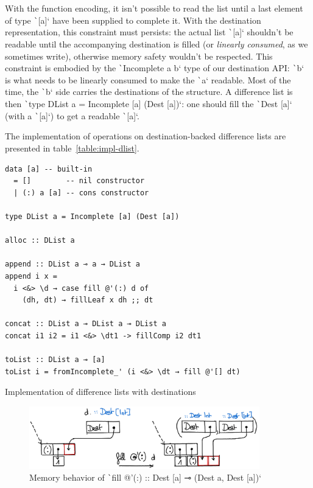 \documentclass[english]{jflart}
\begin{document}
With the function encoding, it isn't possible to read the list until a last element of type \texttt`[a]` have been supplied to complete it. With the destination representation, this constraint must persists: the actual list \texttt`[a]` shouldn't be readable until the accompanying destination is filled (or \emph{linearly consumed}, as we sometimes write), otherwise memory safety wouldn't be respected. This constraint is embodied by the \texttt`Incomplete a b` type of our destination API: \texttt`b` is what needs to be linearly consumed to make the \texttt`a` readable. Most of the time, the \texttt`b` side carries the destinations of the structure. A difference list is then \texttt`type DList a = Incomplete [a] (Dest [a])`: one should fill the \texttt`Dest [a]` (with a \texttt`[a]`) to get a readable \texttt`[a]`.

The implementation of operations on destination-backed difference lists are presented in table~\ref{table:impl-dlist}.
\begin{table}[t]
\small
\begin{verbatim}
data [a] -- built-in
  = []        -- nil constructor
  | (:) a [a] -- cons constructor

type DList a = Incomplete [a] (Dest [a])

alloc :: DList a

append :: DList a ⊸ a → DList a
append i x =
  i <&> \d → case fill @'(:) d of
    (dh, dt) → fillLeaf x dh ;; dt

concat :: DList a ⊸ DList a ⊸ DList a
concat i1 i2 = i1 <&> \dt1 -> fillComp i2 dt1

toList :: DList a ⊸ [a]
toList i = fromIncomplete_' (i <&> \dt → fill @'[] dt)
\end{verbatim}
\caption{Implementation of difference lists with destinations}
\label{table:impl-dlist}
\end{table}

\begin{figure}[t]\centering
  \includegraphics[width=10cm]{fillCons.png}
  \caption{Memory behavior of \texttt`fill @'(:) :: Dest [a] ⊸ (Dest a, Dest [a])`}
  \label{fig:schema-fillCons}
\end{figure}
\end{document}
